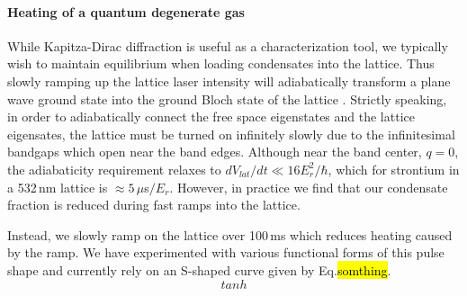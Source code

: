 \paragraph{Heating of a quantum degenerate gas}
While Kapitza-Dirac diffraction is useful as a characterization tool, we typically wish to maintain equilibrium when loading condensates into the lattice. 
Thus slowly ramping up the lattice laser intensity will adiabatically transform a plane wave ground state into the ground Bloch state of the lattice \cite{Sakurai2010}. 
Strictly speaking, in order to adiabatically connect the free space eigenstates and the lattice eigensates, the lattice must be turned on infinitely slowly due to the infinitesimal bandgaps which open near the band edges. 
Although near the band center, $q=0$, the adiabaticity requirement relaxes to $dV_{lat}/dt \ll 16E_r^2/ \hbar$, \cite{Denschlag2002} which for strontium in a 532\,nm lattice is $\approx 5\,\mu$s$/E_r$. However, in practice we find that our condensate fraction is reduced during fast ramps into the lattice. 

Instead, we slowly ramp on the lattice over 100\,ms which reduces heating caused by the ramp. 
We have experimented with various functional forms of this pulse shape and currently rely on an S-shaped curve given by Eq.\hl{somthing}.
\begin{equation}
	tanh
\end{equation}

